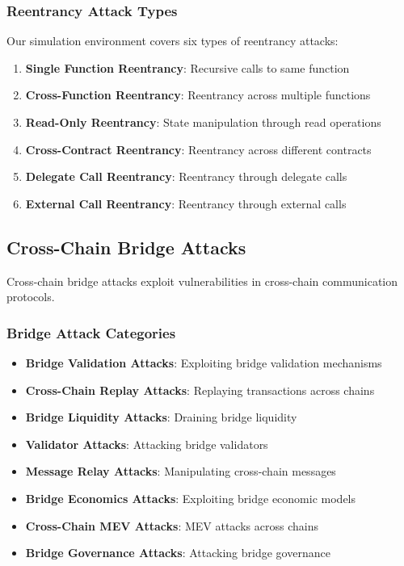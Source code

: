 \documentclass[11pt,a4paper]{article}
\begin{document}
\subsubsection{Reentrancy Attack Types}

Our simulation environment covers six types of reentrancy attacks:

\begin{enumerate}
\item \textbf{Single Function Reentrancy}: Recursive calls to same function
\item \textbf{Cross-Function Reentrancy}: Reentrancy across multiple functions
\item \textbf{Read-Only Reentrancy}: State manipulation through read operations
\item \textbf{Cross-Contract Reentrancy}: Reentrancy across different contracts
\item \textbf{Delegate Call Reentrancy}: Reentrancy through delegate calls
\item \textbf{External Call Reentrancy}: Reentrancy through external calls
\end{enumerate}

\subsection{Cross-Chain Bridge Attacks}

Cross-chain bridge attacks exploit vulnerabilities in cross-chain communication protocols.

\subsubsection{Bridge Attack Categories}

\begin{itemize}
\item \textbf{Bridge Validation Attacks}: Exploiting bridge validation mechanisms
\item \textbf{Cross-Chain Replay Attacks}: Replaying transactions across chains
\item \textbf{Bridge Liquidity Attacks}: Draining bridge liquidity
\item \textbf{Validator Attacks}: Attacking bridge validators
\item \textbf{Message Relay Attacks}: Manipulating cross-chain messages
\item \textbf{Bridge Economics Attacks}: Exploiting bridge economic models
\item \textbf{Cross-Chain MEV Attacks}: MEV attacks across chains
\item \textbf{Bridge Governance Attacks}: Attacking bridge governance
\end{itemize}
\end{document}
